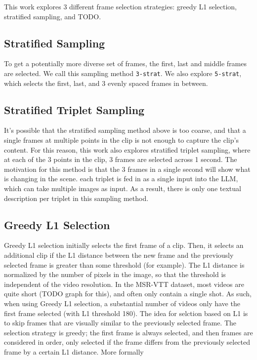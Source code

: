 \documentclass{article}
\begin{document}
This work explores 3 different frame selection strategies:
greedy L1 selection, stratified sampling, and TODO.

\subsection{Stratified Sampling}
To get a potentially more diverse set of frames, the first, last and middle frames are selected.
We call this sampling method \verb|3-strat|. We also explore \verb|5-strat|, which selects the first, last, and 3 evenly spaced frames in between.

\subsection{Stratified Triplet Sampling}
It's possible that the stratified sampling method above is too coarse, and that a single frames at multiple points in the clip is not enough to capture the clip's content.
For this reason, this work also explores stratified triplet sampling, where at each of the 3 points in the clip, 3 frames are selected across 1 second.
The motivation for this method is that the 3 frames in a single second will show what is changing in the scene.
each triplet is fed in as a single input into the LLM, which can take multiple images as input.
As a result, there is only one textual description per triplet in this sampling method.

\subsection{Greedy L1 Selection}
Greedy L1 selection initially selects the first frame of a clip. Then, it selects an additional clip if the L1 distance between the new frame and the previously selected frame is greater than some threshold (for example).
The L1 distance is normalized by the number of pixels in the image, so that the threshold is independent of the video resolution.
In the MSR-VTT dataset, most videos are quite short (TODO graph for this), and often only contain a single shot.
As such, when using Greedy L1 selection, a substantial number of videos only have the first frame selected (with L1 threshold 180).
The idea for selction based on L1 is to skip frames that are visually similar to the previously selected frame.
The selection strategy is greedy; the first frame is always selected, and then frames are considered in order, only selected if the frame differs from the previously selected frame by a certain L1 distance.
More formally
\end{document}
